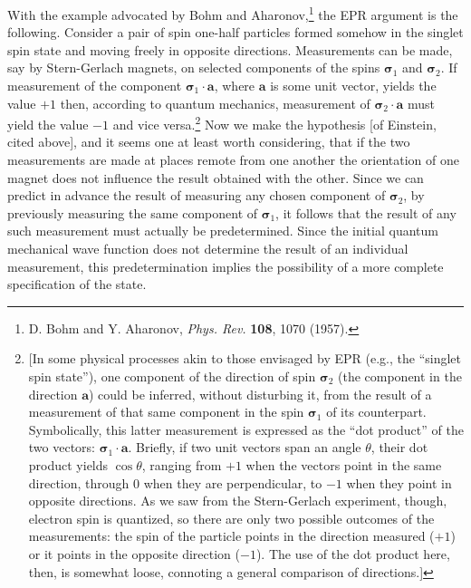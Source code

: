 With the example advocated by Bohm and Aharonov,\footnote{D. Bohm and Y. Aharonov, \emph{Phys. Rev.} \textbf{108}, 1070 (1957).} the EPR argument is the following. Consider
a pair of spin one-half particles formed somehow in the singlet spin state and moving freely in opposite
directions. Measurements can be made, say by Stern-Gerlach magnets, on selected components of the
spins $\pmb{\sigma}_1$ and $\pmb{\sigma}_2$. If measurement of the component $\pmb{\sigma}_1 \cdot \pmb{a}$, where $\pmb{a}$ is some unit vector, yields the value $+1$ then, according to quantum mechanics, measurement of $\pmb{\sigma}_2 \cdot \pmb{a}$ must yield the value $-1$ and vice versa.\footnote{[In some physical processes akin to those envisaged by EPR (e.g., the ``singlet spin state''), one component of the direction of spin $\pmb{\sigma}_2$ (the component in the direction $\pmb{a}$) could be inferred, without disturbing it, from the result of a measurement of that same component in the spin $\pmb{\sigma}_1$ of its counterpart. Symbolically, this latter measurement is expressed as the ``dot product'' of the two vectors: $\pmb{\sigma}_1 \cdot \pmb{a}$. Briefly, if two unit vectors span an angle $\theta$, their dot product yields $\cos \theta$, ranging from $+1$ when the vectors point in the same direction, through $0$ when they are perpendicular, to $-1$ when they point in opposite directions. As we saw from the Stern-Gerlach experiment, though, electron spin is quantized, so there are only two possible outcomes of the measurements: the spin of the particle points in the direction measured ($+1$) or it points in the opposite direction ($-1$). The use of the dot product here, then, is somewhat loose, connoting a general comparison of directions.]}
Now we make the hypothesis [of Einstein, cited above], and it seems one at least worth considering, that if the two measurements
are made at places remote from one another the orientation of one magnet does not influence the
result obtained with the other. Since we can predict in advance the result of measuring any chosen component
of $\pmb{\sigma}_2$, by previously measuring the same component of $\pmb{\sigma}_1$, it follows that the result of any such
measurement must actually be predetermined. Since the initial quantum mechanical wave function does not
determine the result of an individual measurement, this predetermination implies the possibility of a more
complete specification of the state.

